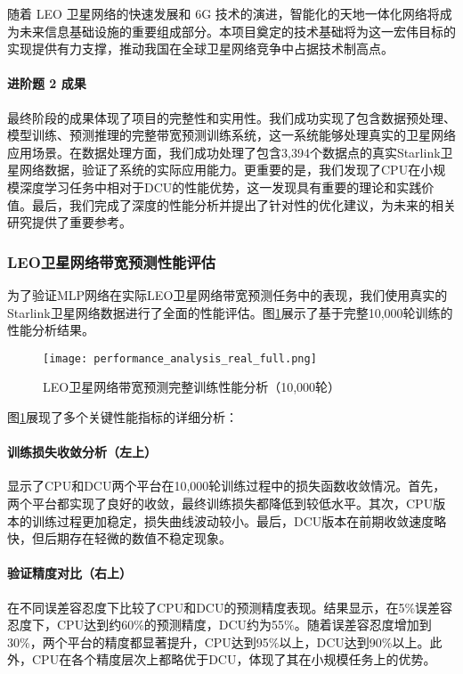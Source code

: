\documentclass[a4paper]{article}
\begin{document}
随着 LEO 卫星网络的快速发展和 6G 技术的演进，智能化的天地一体化网络将成为未来信息基础设施的重要组成部分。本项目奠定的技术基础将为这一宏伟目标的实现提供有力支撑，推动我国在全球卫星网络竞争中占据技术制高点。

\paragraph{进阶题 2 成果}

最终阶段的成果体现了项目的完整性和实用性。我们成功实现了包含数据预处理、模型训练、预测推理的完整带宽预测训练系统，这一系统能够处理真实的卫星网络应用场景。在数据处理方面，我们成功处理了包含3,394个数据点的真实Starlink卫星网络数据，验证了系统的实际应用能力。更重要的是，我们发现了CPU在小规模深度学习任务中相对于DCU的性能优势，这一发现具有重要的理论和实践价值。最后，我们完成了深度的性能分析并提出了针对性的优化建议，为未来的相关研究提供了重要参考。

\subsubsection{LEO卫星网络带宽预测性能评估}

为了验证MLP网络在实际LEO卫星网络带宽预测任务中的表现，我们使用真实的Starlink卫星网络数据进行了全面的性能评估。图\ref{fig:bandwidth_prediction_full}展示了基于完整10,000轮训练的性能分析结果。

\begin{figure}[H]
\centering
\texttt{[image: performance\_analysis\_real\_full.png]}
\caption{LEO卫星网络带宽预测完整训练性能分析（10,000轮）}
\label{fig:bandwidth_prediction_full}
\end{figure}

图\ref{fig:bandwidth_prediction_full}展现了多个关键性能指标的详细分析：

\paragraph{训练损失收敛分析（左上）}显示了CPU和DCU两个平台在10,000轮训练过程中的损失函数收敛情况。首先，两个平台都实现了良好的收敛，最终训练损失都降低到较低水平。其次，CPU版本的训练过程更加稳定，损失曲线波动较小。最后，DCU版本在前期收敛速度略快，但后期存在轻微的数值不稳定现象。

\paragraph{验证精度对比（右上）}在不同误差容忍度下比较了CPU和DCU的预测精度表现。结果显示，在5\%误差容忍度下，CPU达到约60\%的预测精度，DCU约为55\%。随着误差容忍度增加到30\%，两个平台的精度都显著提升，CPU达到95\%以上，DCU达到90\%以上。此外，CPU在各个精度层次上都略优于DCU，体现了其在小规模任务上的优势。
\end{document}
